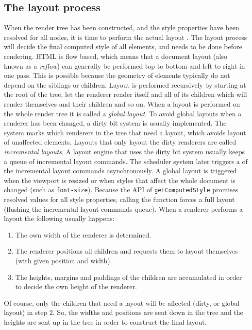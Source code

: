 \documentclass[a4paper,11pt]{kth-mag}
\newcommand{\code}[1]{\texttt{#1}}
\begin{document}

      \subsection{The layout process}\label{sec:layout-process}
        When the \gls{render tree} has been constructed, and the style properties have been resolved for all nodes, it is time to perform the actual layout \cite{garsiel2011browsers}.
        The layout process will decide the final computed style of all \glspl{element}, and needs to be done before rendering.
        \gls{HTML} is flow based, which means that a \gls{document} layout (also known as a \emph{reflow}) can generally be performed top to bottom and left to right in one pass.
        This is possible because the geometry of \glspl{element} typically do not depend on the siblings or children.
        Layout is performed recursively by starting at the root of the tree, let the renderer render itself and all of its children which will render themselves and their children and so on.
        When a layout is performed on the whole \gls{render tree} it is called a \emph{global layout}.
        To avoid global layouts when a renderer has been changed, a dirty bit system is usually implemented.
        The system marks which renderers in the tree that need a layout, which avoids layout of unaffected \glspl{element}.
        Layouts that only layout the dirty renderers are called \emph{incremental layouts}.
        A \gls{layout engine} that uses the dirty bit system usually keeps a queue of incremental layout commands.
        The scheduler system later triggers a  of the incremental layout commands asynchronously.
        A global layout is triggered when the \gls{viewport} is resized or when styles that affect the whole \gls{document} is changed (such as \code{font-size}).
        Because the \gls{API} of \code{getComputedStyle} promises resolved values for all style properties, calling the function forces a full layout (flushing the incremental layout commands queue).
        When a renderer performs a layout the following usually happens:
        \begin{enumerate}
          \item The own width of the renderer is determined.
          \item The renderer positions all children and requests them to layout themselves (with given position and width).
          \item The heights, margins and paddings of the children are accumulated in order to decide the own height of the renderer.
        \end{enumerate}
        Of course, only the children that need a layout will be affected (dirty, or global layout) in step 2.
        So, the widths and positions are sent down in the tree and the heights are sent up in the tree in order to construct the final layout.
\end{document}
